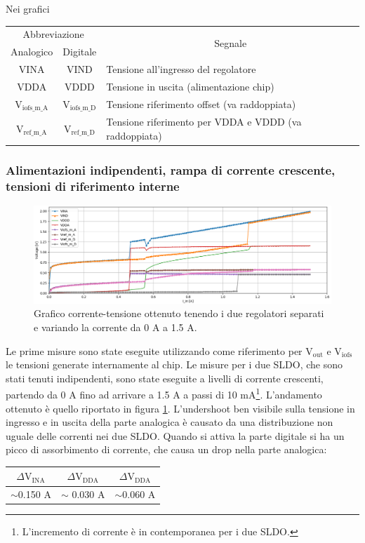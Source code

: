 Nei grafici 
\begin{center}
\begin{tabular}{|cc|l|}
\hline
\multicolumn{2}{|c|}{Abbreviazione} & \multicolumn{1}{c|}{\multirow{2}{*}{Segnale}}\\ 
Analogico & Digitale & \\
\hline
VINA & VIND & Tensione all'ingresso del regolatore  \\ \hline
VDDA & VDDD & Tensione in uscita (alimentazione chip) \\ \hline
$\mathrm{V_{iofs \_ m \_ A}}$ & $\mathrm{V_{iofs \_ m \_ D}}$ & Tensione riferimento offset (va raddoppiata) \\ \hline   
$\mathrm{V_{ref \_ m \_ A}}$ & $\mathrm{V_{ref \_ m \_ D}}$ & Tensione riferimento per VDDA e VDDD (va raddoppiata)\\ \hline   
\end{tabular}
\end{center}

\subsubsection{Alimentazioni indipendenti, rampa di corrente crescente, tensioni di riferimento interne}
\begin{figure}
\centering
\includegraphics[scale=.3]{Immagini/IUI2}
\caption{Grafico corrente-tensione ottenuto tenendo i due regolatori separati e variando la corrente da 0 A a 1.5 A.}
\label{IUI}
\end{figure}
Le prime misure sono state eseguite utilizzando come riferimento per $\mathrm{V_{out}}$ e $\mathrm{V_{iofs}}$ le tensioni generate internamente al chip. Le misure per i due SLDO, che sono stati tenuti indipendenti, sono state eseguite a livelli di corrente crescenti, partendo da 0 A fino ad arrivare a 1.5 A a passi di 10 mA\footnote{L'incremento di corrente è in contemporanea per i due SLDO.}. 
L'andamento ottenuto è quello riportato in figura \ref{IUI}. L'undershoot ben visibile sulla tensione in ingresso e in uscita della parte analogica è causato da una distribuzione non uguale delle correnti nei due SLDO. 
Quando si attiva la parte digitale si ha un picco di assorbimento di corrente, che causa un drop nella parte analogica:
\begin{center}
\begin{tabular}{ccc }
\hline
$\Delta \mathrm{V_{INA}}$ & $\Delta \mathrm{V_{DDA}}$ &$\Delta \mathrm{V_{DDA}}$  \\ \hline
$\sim$0.150 A & $\sim$ 0.030 A& $\sim$0.060 A\\ \hline     
\end{tabular}
\end{center}

